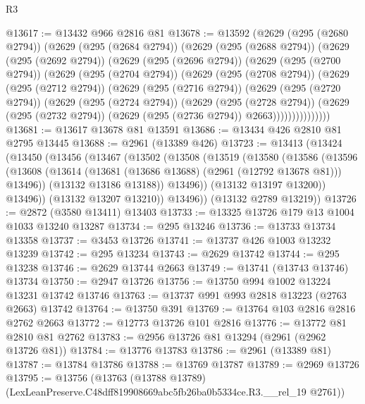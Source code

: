 \begin{lexlean}{R3}
\begin{coremodule}
@13617 := @13432 @966 @2816 @81
@13678 := @13592
    (@2629
      (@295 (@2680 @2794))
      (@2629
        (@295 (@2684 @2794))
        (@2629
          (@295 (@2688 @2794))
          (@2629
            (@295 (@2692 @2794))
            (@2629
              (@295 (@2696 @2794))
              (@2629
                (@295 (@2700 @2794))
                (@2629
                  (@295 (@2704 @2794))
                  (@2629
                    (@295 (@2708 @2794))
                    (@2629
                      (@295 (@2712 @2794))
                      (@2629
                        (@295 (@2716 @2794))
                        (@2629
                          (@295 (@2720 @2794))
                          (@2629
                            (@295 (@2724 @2794))
                            (@2629
                              (@295 (@2728 @2794))
                              (@2629
                                (@295 (@2732 @2794))
                                (@2629 (@295 (@2736 @2794)) @2663)))))))))))))))
@13681 := @13617 @13678 @81 @13591
@13686 := @13434 @426 @2810 @81 @2795 @13445
@13688 := @2961 (@13389 @426)
@13723 := @13413
    (@13424
      (@13450
        (@13456
          (@13467
            (@13502
              (@13508
                (@13519
                  (@13580
                    (@13586
                      (@13596
                        (@13608
                          (@13614 (@13681 (@13686 @13688) (@2961 (@12792 @13678 @81))) @13496))
                        (@13132 @13186 @13188))
                      @13496))
                  (@13132 @13197 @13200))
                @13496))
            (@13132 @13207 @13210))
          @13496))
      (@13132 @2789 @13219))
@13726 := @2872 (@3580 @13411) @13403
@13733 := @13325 @13726 @179 @13 @1004 @1033 @13240 @13287
@13734 := @295 @13246
@13736 := @13733 @13734 @13358
@13737 := @3453 @13726
@13741 := @13737 @426 @1003 @13232 @13239
@13742 := @295 @13234
@13743 := @2629 @13742
@13744 := @295 @13238
@13746 := @2629 @13744 @2663
@13749 := @13741 (@13743 @13746) @13734
@13750 := @2947 @13726
@13756 := @13750 @994 @1002 @13224 @13231 @13742 @13746
@13763 := @13737 @991 @993 @2818 @13223 (@2763 @2663) @13742
@13764 := @13750 @391
@13769 := @13764 @103 @2816 @2816 @2762 @2663
@13772 := @12773 @13726 @101 @2816
@13776 := @13772 @81 @2810 @81 @2762
@13783 := @2956 @13726 @81 @13294 (@2961 (@2962 @13726 @81))
@13784 := @13776 @13783
@13786 := @2961 (@13389 @81)
@13787 := @13784 @13786
@13788 := @13769 @13787
@13789 := @2969 @13726
@13795 := @13756
    (@13763 (@13788 @13789) (LexLeanPreserve.C48dff819908669abc5fb26ba0b5334ce.R3.__rel_19 @2761))

\end{coremodule}
\end{lexlean}
